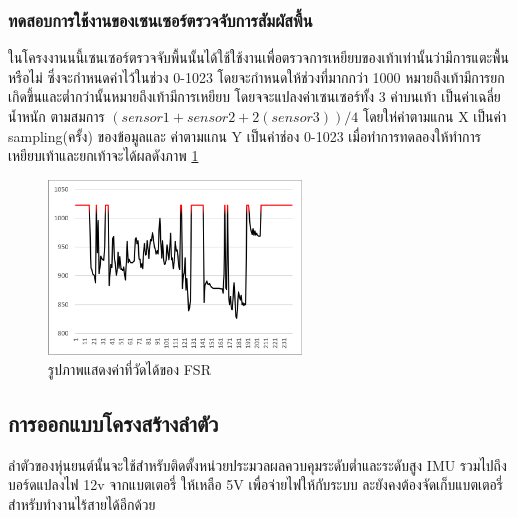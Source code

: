 \subsubsection{ทดสอบการใช้งานของเซนเซอร์ตรวจจับการสัมผัสพื้น}
ในโครงงานนนี้เซนเซอร์ตรวจจับพื้นนั้นได้ใช้ใช้งานเพื่อตรวจการเหยียบของเท้าเท่านั้นว่ามีการแตะพื้นหรือไม่ ซึ่งจะกำหนดค่าไว้ในช่วง 
0-1023 โดยจะกำหนดให้ช่วงที่มากกว่า 1000 หมายถึงเท้ามีการยกเกิดขึ้นและต่ำกว่านั้นหมายถึงเท้ามีการเหยียบ โดยจจะแปลงค่าเซนเซอร์ทั้ง 3 ค่าบนเท้า
เป็นค่าเฉลี่ยน้ำหนัก ตามสมการ $(sensor1 + sensor 2 + 2(sensor3))/4$ โดยให่ค่าตามแกน X เป็นค่า sampling(ครั้ง) ของข้อมูลและ
ค่าตามแกน Y เป็นค่าช่อง 0-1023 เมื่อทำการทดลองให้ทำการเหยียบเท้าและยกเท้าจะได้ผลดังภาพ \ref{fig:FSR_graph}

\begin{figure}[h!]
  \centering
  \includegraphics[width=0.6\textwidth]{chapter4/images/FSR_graph.png}
  \caption{รูปภาพแสดงค่าที่วัดได้ของ FSR}
  \label{fig:FSR_graph}
\end{figure}

\clearpage
\subsection{การออกแบบโครงสร้างลำตัว}
ลำตัวของหุ่นยนต์นั้นจะใช้สำหรับติดตั้งหน่วยประมวลผลควบคุมระดับต่ำและระดับสูง IMU รวมไปถึงบอร์ดแปลงไฟ 12v จากแบตเตอรี่
ให้เหลือ 5V เพื่อจ่ายไฟให้กับระบบ ละยังคงต้องจัดเก็บแบตเตอรี่สำหรับทำงานไร้สายได้อีกด้วย 
